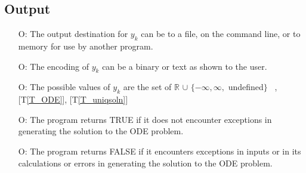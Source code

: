 \documentclass[12pt]{article}
\newcommand{\tref}[1]{T\ref{#1}}
\newcommand{\gsref}[1]{GS\ref{#1}}
\newcounter{outputnum} %
\begin{document}
\subsection{Output} \label{sec_Output}

\begin{itemize}
\item[O\refstepcounter{outputnum}\theoutputnum \label{O_outputyk}:]
The output destination for $y_k$ can be to a file, on the command line, or to memory for use by
another program.
~\newline
[\gsref{G_SolveForY}]

\item[O\refstepcounter{outputnum}\theoutputnum \label{O_encodingyk}:]
The encoding of $y_k$ can be a binary or text as shown to the user.

\item[O\refstepcounter{outputnum}\theoutputnum \label{O_valuesyk}:]
The possible values of $y_k$ are the set of $\mathbb{R}$
$\cup$ $\{-\infty, \infty,$ undefined$\}$
~\newline
[\gsref{G_SolveForY}], [\tref{T_ODE}], [\tref{T_uniqsoln}]

\item[O\refstepcounter{outputnum}\theoutputnum \label{O_success}:]
The program returns TRUE if it does not encounter exceptions in generating the solution
to the ODE problem.

\item[O\refstepcounter{outputnum}\theoutputnum \label{O_fail}:]
The program returns FALSE if it encounters exceptions in inputs or in its calculations
or errors in generating the solution to the ODE problem.
~\newline
[\gsref{G_SolveForY}]

\end{itemize}
\end{document}

